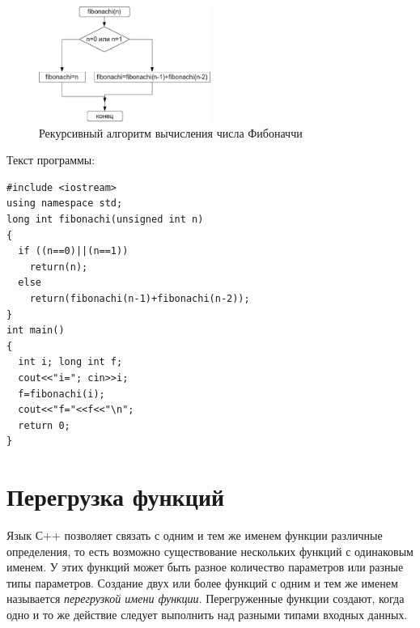 \begin{figure}[htb]
\begin{center}
\includegraphics[width=0.5\textwidth]{img/ris_4_12}
\caption{Рекурсивный алгоритм вычисления числа Фибоначчи}
\label{ch04:refDrawing11}
\end{center}
\end{figure}

Текст программы:
\begin{lstlisting}
#include <iostream> 
using namespace std;
long int fibonachi(unsigned int n) 
{
  if ((n==0)||(n==1)) 
    return(n); 
  else 
    return(fibonachi(n-1)+fibonachi(n-2)); 
}
int main()
{
  int i; long int f;
  cout<<"i="; cin>>i;
  f=fibonachi(i);
  cout<<"f="<<f<<"\n";
  return 0;
}
\end{lstlisting}

\section[Перегрузка функций]{Перегрузка функций}
Язык С++ позволяет связать с одним и тем же именем функции различные определения, то есть возможно существование
нескольких функций с одинаковым именем. У этих функций может быть разное количество параметров или разные типы
параметров. Создание двух или более функций с одним и тем же именем называется \emph{перегрузкой имени функции}. Перегруженные функции создают, когда одно и то же действие следует
выполнить над разными типами входных данных.

